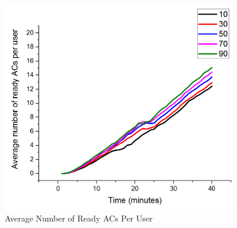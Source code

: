 \begin{figure} [hbtp]
  \centering 
  \includegraphics[width=4.0in]{figures/F421AverageNumberofReadyACsPerUser.png}
  \caption{Average Number of Ready ACs Per User} 
  \label{fig:F421AverageNumberofReadyACsPerUser} %
\end{figure}


